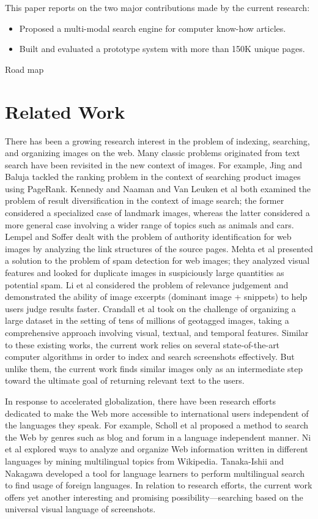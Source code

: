 \documentclass{www2010-submission}
\begin{document}
This paper reports on the two major contributions made by the current research:
\begin{itemize}
\item Proposed a multi-modal search engine for computer know-how articles.
\item Built and evaluated a prototype system with more than 150K unique
pages.
\end{itemize}

Road map

\section{Related Work}

There has been a growing research interest in the problem of indexing,
searching, and organizing images on the web.  Many classic problems
originated from text search have been revisited in the new context of
images. For example, Jing and Baluja \cite{Jing} tackled the ranking
problem in the context of searching product images using PageRank.
Kennedy and Naaman \cite{Kennedy} and Van Leuken et al
\cite{vanLeuken} both examined the problem of result diversification in
the context of image search; the former considered a specialized case
of landmark images, whereas the latter considered a more general case
involving a wider range of topics such as animals and cars. Lempel and
Soffer \cite{Lempel} dealt with the problem of authority
identification for web images by analyzing the link structures of the
source pages.  Mehta et al \cite{Mehta} presented a solution to the
problem of spam detection for web images; they analyzed visual
features and looked for duplicate images in suspiciously large
quantities as potential spam.  Li et al \cite{Li} considered the
problem of relevance judgement and demonstrated the ability of image
excerpts (dominant image + snippets) to help users judge results
faster. Crandall et al \cite{Crandall} took on the challenge of
organizing a large dataset in the setting of tens of millions of
geotagged images, taking a comprehensive approach involving visual,
textual, and temporal features. Similar to these existing works, the
current work relies on several state-of-the-art computer algorithms in
order to index and search screenshots effectively. But unlike them,
the current work finds similar images only as an intermediate step
toward the ultimate goal of returning relevant text to the users.

In response to accelerated globalization, there have been research
efforts dedicated to make the Web more accessible to international
users independent of the languages they speak. For example, Scholl et
al \cite{Scholl} proposed a method to search the Web by genres such as
blog and forum in a language independent manner. Ni et al \cite{Ni}
explored ways to analyze and organize Web information written in
different languages by mining multilingual topics from
Wikipedia. Tanaka-Ishii and Nakagawa \cite{Tanaka-Ishii} developed a
tool for language learners to perform multilingual search to find
usage of foreign languages. In relation to research efforts,
the current work offers yet another interesting and promising
possibility---searching based on the universal
visual language of screenshots.
\end{document}
